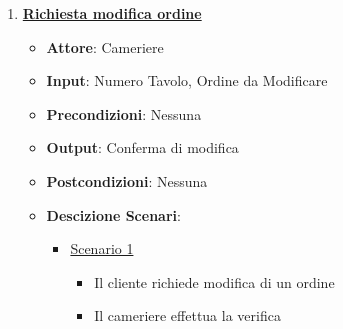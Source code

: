 \begin{enumerate}
\begin{itemize}
\begin{itemize}
            \item \uline{{\bf Scenario 2}}:
            \begin{itemize}
                \item L'utente chiama per la prenotazione di un men\`u fisso
                \item L'operatore controlla la disponibilit\`a del men\`u
                \item L'operatore comunica la disponibilit\`a del men\`u all'utente
                \item L'utente conferma la prenotazione
            \end{itemize}
            \item \uline{{\bf Scenario 3}}
            \begin{itemize}
                \item L'utente chiama per la prenotazione di una sala
                \item L'operatore controlla la disponibilit\`a della sala
                \item L'operatore comunica la disponibilit\`a della sala
                \item L'utente concorda il men\`u con il proprietario
                \item L'utente conferma la prenotazione
            \end{itemize}
        \end{itemize}
    \end{itemize}
    \item \uline {{\bf Richiesta modifica ordine}}
    \begin{itemize}
        \item {\bf Attore}: Cameriere
        \item {\bf Input}: Numero Tavolo, Ordine da Modificare
        \item {\bf Precondizioni}: Nessuna
        \item {\bf Output}: Conferma di modifica
        \item {\bf Postcondizioni}: Nessuna
        \item {\bf Descizione Scenari}:
        \begin{itemize}
            \item \uline{Scenario 1}
            \begin{itemize}
                \item Il cliente richiede modifica di un ordine
                \item Il cameriere effettua la verifica 

\end{itemize}
\end{itemize}
\end{itemize}
\end{enumerate}
